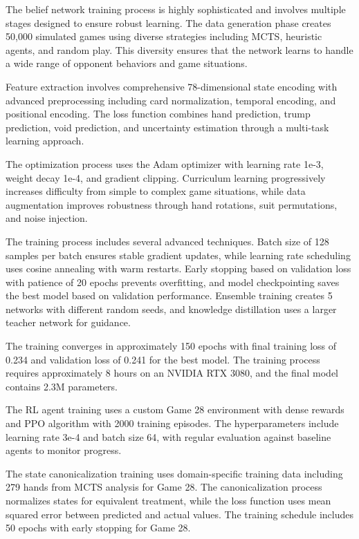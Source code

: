 \documentclass[conference]{IEEEtran}
\begin{document}
The belief network training process is highly sophisticated and involves multiple stages designed to ensure robust learning. The data generation phase creates 50,000 simulated games using diverse strategies including MCTS, heuristic agents, and random play. This diversity ensures that the network learns to handle a wide range of opponent behaviors and game situations.

Feature extraction involves comprehensive 78-dimensional state encoding with advanced preprocessing including card normalization, temporal encoding, and positional encoding. The loss function combines hand prediction, trump prediction, void prediction, and uncertainty estimation through a multi-task learning approach.

The optimization process uses the Adam optimizer with learning rate 1e-3, weight decay 1e-4, and gradient clipping. Curriculum learning progressively increases difficulty from simple to complex game situations, while data augmentation improves robustness through hand rotations, suit permutations, and noise injection.

The training process includes several advanced techniques. Batch size of 128 samples per batch ensures stable gradient updates, while learning rate scheduling uses cosine annealing with warm restarts. Early stopping based on validation loss with patience of 20 epochs prevents overfitting, and model checkpointing saves the best model based on validation performance. Ensemble training creates 5 networks with different random seeds, and knowledge distillation uses a larger teacher network for guidance.

The training converges in approximately 150 epochs with final training loss of 0.234 and validation loss of 0.241 for the best model. The training process requires approximately 8 hours on an NVIDIA RTX 3080, and the final model contains 2.3M parameters.

The RL agent training uses a custom Game 28 environment with dense rewards and PPO algorithm with 2000 training episodes. The hyperparameters include learning rate 3e-4 and batch size 64, with regular evaluation against baseline agents to monitor progress.

The state canonicalization training uses domain-specific training data including 279 hands from MCTS analysis for Game 28. The canonicalization process normalizes states for equivalent treatment, while the loss function uses mean squared error between predicted and actual values. The training schedule includes 50 epochs with early stopping for Game 28.
\end{document}

